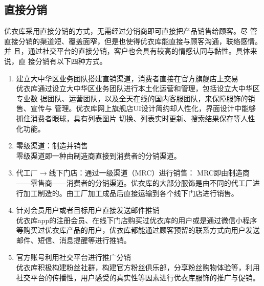 \documentclass{xjtureport}
\begin{document}
\subsection{直接分销}
优衣库采用直接分销的方式，无需经过分销商即可直接把产品销售给顾客。尽
管直接分销的渠道短、覆盖面窄，但是也使得优衣库能直接与顾客沟通，联络感情。并
且，通过社交平台的直接分销，客户也会具有较高的情感认同与黏性。具体来说，直
接分销有以下四种方式。
\begin{enumerate}
    \item 建立大中华区业务团队搭建直销渠道，消费者直接在官方旗舰店上交易\\
    优衣库通过设立大中华区业务团队进行本土化运营和管理，包括设立大中华区专业数
据团队、运营团队，以及全天在线的国内客服团队，来保障服饰的销售、宣传与
管理。优衣库网上旗舰店UI设计简约却人性化，界面设计中能够抓住消费者眼球，具有列表图片
切换、列表实时更新、搜索结果保存等人性化功能。
\item 零级渠道：制造并销售\\
零级渠道即一种由制造商直接到消费者的分销渠道。
\item 代工厂$\to$线下门店：通过一级渠道（MRC）进行销售：
    MRC即由制造商——零售商——消费者的分销渠道。优衣库的大部分服饰是由不同的代工厂进行加工制造的。由工厂加工成品后直接运输到各个线下门店进行销售。
    \item 针对会员用户或者目标用户直接发送邮件推销\\
    优衣库app的注册会员、在线下门店购买过优衣库的用户或是通过微信小程序等购买过优衣库产品的用户，优衣库都能通过顾客预留的联系方式向用户发送邮件、短信、消息提醒等进行推销。
    \item 官方账号利用社交平台进行推广分销\\
    优衣库积极构建粉丝社群，构建官方粉丝俱乐部，分享粉丝购物体验等，利用社交平台的传播性，用户感受的真实性等因素进行优衣库服饰的推广与促销。
\end{enumerate}
\end{document}
